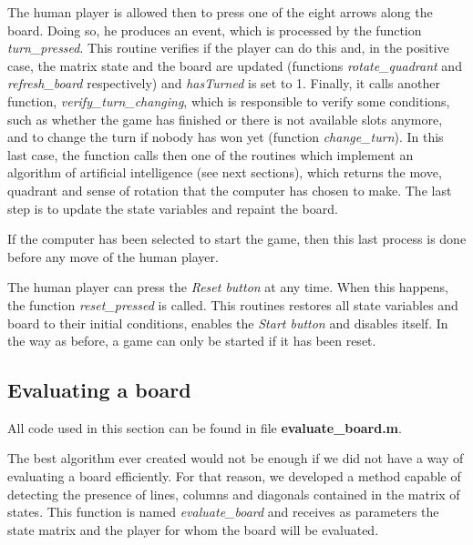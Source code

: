 \vspace{10pt}

The human player is allowed then to press one of the eight arrows along the
board. Doing so, he produces an event, which is processed by the function
\textit{turn\_pressed}.  This routine verifies if the player can do this and, in
the positive case, the matrix state and the board are updated (functions
\textit{rotate\_quadrant} and \textit{refresh\_board} respectively) and
\textit{hasTurned} is set to 1. Finally, it calls another function,
\textit{verify\_turn\_changing}, which is responsible to verify some conditions,
such as whether the game has finished or there is not available slots anymore,
and to change the turn if nobody has won yet (function \textit{change\_turn}). 
In this last case, the function calls then one of the routines which implement
an algorithm of artificial intelligence (see next sections), which returns the
move, quadrant and sense of rotation that the computer has chosen to make. The
last step is to update the state variables and repaint the board.

\vspace{10pt}

If the computer has been selected to start the game, then this last  process is
done before any move of the human player.

\vspace{10pt}

The  human player can press the \textit{Reset button} at any time. When this
happens, the function \textit{reset\_pressed} is called. This routines restores all state
variables and board to their initial conditions, enables the \textit{Start
button} and disables itself. In the way as before, a game can only be started if
it has been reset.

\subsection{Evaluating a board}

All code used in this section can be found in file \textbf{evaluate\_board.m}.

\vspace{10pt}

The best algorithm ever created would not be enough if we did not have a way of
evaluating a board efficiently. For that reason, we developed a method capable
of detecting the presence of lines, columns and diagonals contained in the
matrix  of states. This function is named \textit{evaluate\_board} and receives
as parameters the state matrix and the player for whom the board will be
evaluated.

